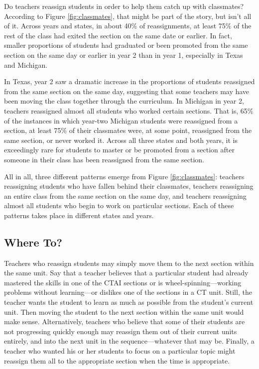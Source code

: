 \documentclass[12pt]{article}\usepackage[]{graphicx}\usepackage[]{color}
\begin{document}
Do teachers reassign students in order to help them catch up with classmates?
According to Figure \ref{fig:classmates}, that might be part of the
story, but isn't all of it.
Across years and states, in about 40\% of
reassignments, at least 75\% of the rest of the class had exited the
section on the same date or earlier.
In fact, smaller proportions of students had graduated or been
promoted from the same section on the same day or earlier in year 2
than in year 1, especially in Texas and Michigan.

In Texas, year 2 saw a dramatic increase in the proportions of
students reassigned from the same section on the same day, suggesting
that some teachers may have been moving the class together through the
curriculum.
In Michigan in year 2, teachers reassigned almost all students who
worked certain sections.
That is, 65\% of the instances in which year-two Michigan
students were reassigned from a section, at least 75\% of their
classmates were, at some point, reassigned from the same section, or
never worked it.
Across all three states and both years, it is exceedingly rare for
students to master or be promoted from a section after someone in
their class has been reassigned from the same section.

All in all, three different patterns emerge from Figure
\ref{fig:classmates}: teachers reassigning students who have fallen
behind their classmates, teachers reassigning an entire class from the
same section on the same day, and teachers reassigning almost all
students who begin to work on particular sections.
Each of these patterns takes place in different states and
years.

\subsection{Where To?}

Teachers who reassign students may simply move them to the next
section within the same unit.
Say that a teacher believes that a particular student had already mastered
the skills in one of the CTAI sections or is wheel-spinning---working
problems without learning---or dislikes one of the sections in a CT unit.
Still, the teacher wants the student to learn as much as possible from
the student's current unit.
Then moving the student to the next section within the same unit would
make sense.
Alternatively, teachers who believe that some of their students are
not progressing quickly enough may reassign them out of their current
units entirely, and into the next unit in the sequence---whatever that
may be.
Finally, a teacher who wanted his or her students to focus on a
particular topic might reassign them all to the appropriate section
when the time is appropriate.
\end{document}

